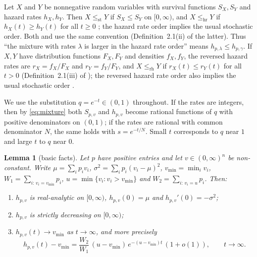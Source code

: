 \documentclass[10pt]{article}
\theoremstyle{plain}
\newtheorem{lemma}[theorem]{Lemma}
\theoremstyle{definition}
\theoremstyle{remark}
\newcommand{\hr}{\mathrm{hr}}
\newcommand{\st}{\mathrm{st}}
\begin{document}
Let $X$ and $Y$ be nonnegative random variables with survival functions $S_X,S_Y$ and hazard rates $h_X,h_Y$. Then $X\le_{\st}Y$ if $S_X\le S_Y$ on $[0,\infty)$, and $X\le_{\hr}Y$ if $h_X(t)\ge h_Y(t)$ for all $t\ge 0$ \cite[Sections~1.A and~1.B]{ShakedShanthikumar2007}; the hazard rate order implies the usual stochastic order. Both \cite{ShojaeeAsadiFinkelstein2022} and \cite{SahooKayalFinkelstein2026} use the same convention (Definition~2.1(ii) of the latter). Thus ``the mixture with rates $\lambda$ is larger in the hazard rate order'' means $h_{p,\lambda}\le h_{p,\gamma}$. If $X,Y$ have distribution functions $F_X,F_Y$ and densities $f_X,f_Y$, the reversed hazard rates are $r_X=f_X/F_X$ and $r_Y=f_Y/F_Y$, and $X\le_{\mathrm{rh}}Y$ if $r_X(t)\le r_Y(t)$ for all $t>0$ (Definition~2.1(iii) of \cite{SahooKayalFinkelstein2026}); the reversed hazard rate order also implies the usual stochastic order \cite[Section~1.B]{ShakedShanthikumar2007}.

We use the substitution $q=e^{-t}\in(0,1)$ throughout. If the rates are integers, then by \eqref{eq:mixture} both $S_{p,v}$ and $h_{p,v}$ become rational functions of $q$ with positive denominators on $(0,1)$; if the rates are rational with common denominator $N$, the same holds with $s=e^{-t/N}$. Small $t$ corresponds to $q$ near $1$ and large $t$ to $q$ near $0$.

\begin{lemma}[basic facts]\label{lem:basic}
Let $p$ have positive entries and let $v\in(0,\infty)^n$ be non-constant. Write $\mu=\sum_i p_i v_i$, $\sigma^2=\sum_i p_i(v_i-\mu)^2$, $v_{\min}=\min_i v_i$, $W_1=\sum_{i:\,v_i=v_{\min}}p_i$, $u=\min\{v_i: v_i>v_{\min}\}$ and $W_2=\sum_{i:\,v_i=u}p_i$. Then:
\begin{enumerate}
\item[(a)] $h_{p,v}$ is real-analytic on $[0,\infty)$, $h_{p,v}(0)=\mu$ and $h_{p,v}'(0)=-\sigma^2$;
\item[(b)] $h_{p,v}$ is strictly decreasing on $[0,\infty)$;
\item[(c)] $h_{p,v}(t)\to v_{\min}$ as $t\to\infty$, and more precisely
\[
h_{p,v}(t)-v_{\min}=\frac{W_2}{W_1}\,(u-v_{\min})\,e^{-(u-v_{\min})t}\,(1+o(1)),\qquad t\to\infty .
\]
\end{enumerate}
\end{lemma}
\end{document}
